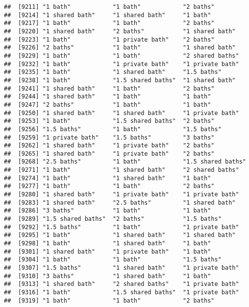 \documentclass[
]{article}
\begin{document}
\begin{verbatim}
##  [9211] "1 bath"            "1 bath"            "2 baths"          
##  [9214] "1 shared bath"     "1 shared bath"     "1 bath"           
##  [9217] "1 bath"            "1 bath"            "2 baths"          
##  [9220] "1 shared bath"     "2 baths"           "1 shared bath"    
##  [9223] "1 bath"            "1 private bath"    "2 baths"          
##  [9226] "2 baths"           "1 bath"            "1 shared bath"    
##  [9229] "1 bath"            "1 bath"            "2 shared baths"   
##  [9232] "1 bath"            "1 private bath"    "1 private bath"   
##  [9235] "1 bath"            "1 shared bath"     "1.5 baths"        
##  [9238] "1 bath"            "1.5 shared baths"  "1 shared bath"    
##  [9241] "1 shared bath"     "1 bath"            "2 baths"          
##  [9244] "1 shared bath"     "1 bath"            "1 bath"           
##  [9247] "2 baths"           "1 bath"            "1 bath"           
##  [9250] "1 shared bath"     "1 shared bath"     "1 private bath"   
##  [9253] "1 bath"            "1.5 shared baths"  "2 baths"          
##  [9256] "1.5 baths"         "1 bath"            "1.5 baths"        
##  [9259] "1 private bath"    "1.5 baths"         "3 baths"          
##  [9262] "1 shared bath"     "1 private bath"    "2 baths"          
##  [9265] "1 shared bath"     "1 private bath"    "2 baths"          
##  [9268] "2.5 baths"         "1 bath"            "1.5 shared baths" 
##  [9271] "1 bath"            "1 shared bath"     "2 shared baths"   
##  [9274] "1 bath"            "1 shared bath"     "1 bath"           
##  [9277] "1 bath"            "1 bath"            "2 baths"          
##  [9280] "1 shared bath"     "1 private bath"    "1 private bath"   
##  [9283] "1 shared bath"     "2.5 baths"         "1 shared bath"    
##  [9286] "3 baths"           "1 bath"            "1 bath"           
##  [9289] "1.5 shared baths"  "2 baths"           "1.5 baths"        
##  [9292] "1.5 baths"         "1 bath"            "1 private bath"   
##  [9295] "1 bath"            "1 shared bath"     "1 shared bath"    
##  [9298] "1 bath"            "1 shared bath"     "1 bath"           
##  [9301] "1 shared bath"     "1 private bath"    "1 bath"           
##  [9304] "1 bath"            "1 bath"            "1.5 baths"        
##  [9307] "1.5 baths"         "1 shared bath"     "1 private bath"   
##  [9310] "3 baths"           "1 shared bath"     "1 bath"           
##  [9313] "1 shared bath"     "2 shared baths"    "1 private bath"   
##  [9316] "1 bath"            "1.5 shared baths"  "1 private bath"   
##  [9319] "1 bath"            "1 bath"            "2 baths"          

\end{verbatim}
\end{document}
